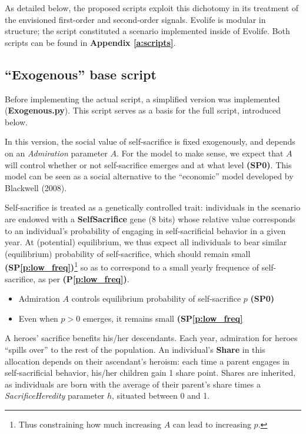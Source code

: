 \documentclass[a4paper,12pt]{report}
\begin{document}
As detailed below,
the proposed scripts exploit
this dichotomy in its treatment of the envisioned
first-order and second-order signals. Evolife is modular in structure;
the script constituted a scenario implemented inside of Evolife.
Both scripts can be found in \textbf{Appendix 
    \ref{a:scripts}}.

\subsection{“Exogenous” base script}
Before implementing the actual script, a simplified version was
implemented (\textbf{Exogenous.py}). 
This script serves as a basis for the full script, introduced below.

In this version, the social value of self-sacrifice
is fixed exogenously, and depends on an \emph{Admiration} parameter $A$.
For the model to make sense, we expect that $A$ will control
whether or not self-sacrifice emerges and at what level \textbf{(SP0)}.
This model can be seen as a social alternative to the
“economic” model developed by Blackwell (2008).

Self-sacrifice is treated as a genetically controlled trait:
individuals in the scenario are endowed with a \textbf{SelfSacrifice} gene (8 bits)
whose relative value corresponds to an individual’s probability of
engaging in self-sacrificial behavior in a given year. 
At (potential) equilibrium, we thus expect all individuals to bear similar (equilibrium)
probability of self-sacrifice, which should remain small \textbf{(SP\ref{p:low_freq})}\footnote{
    Thus constraining how much increasing $A$ can lead to increasing $p$.
}
so as to correspond
to a small yearly frequence of self-sacrifice, as per \textbf{(P\ref{p:low_freq})}.

\begin{spe_predict*}
    \label{spe_p:exo}
    \leavevmode
    \begin{itemize}
        \item Admiration $A$ controls equilibrium probability of self-sacrifice $p$
         \textbf{(SP0)}
        \item Even when $p>0$ emerges, it remains small \textbf{(SP\ref{p:low_freq}}
    \end{itemize}
\end{spe_predict*}

A heroes’ sacrifice benefits his/her descendants.
Each year, admiration for heroes “spills over” to the rest of the population.
An individual’s \textbf{Share} in this allocation depends on their ascendant’s heroism:
each time a parent engages in self-sacrificial behavior,
his/her children gain 1 share point.
Shares are inherited, as individuals are born with the average of their parent’s
share times a \emph{SacrificeHeredity} parameter $h$, situated between 0 and 1.
\end{document}

